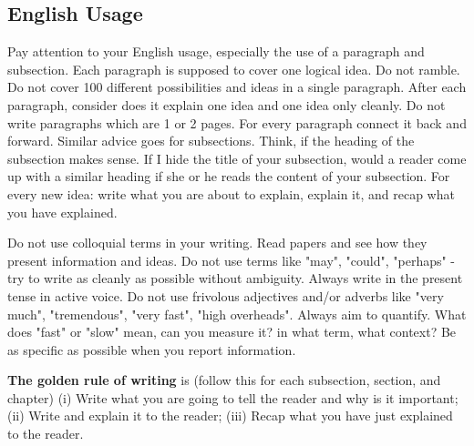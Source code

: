 \documentclass[11pt]{article}
\begin{document}
\subsection*{English Usage}
Pay attention to your English usage, especially the use of a paragraph and subsection. Each paragraph is supposed to cover one logical idea. Do not ramble. Do not cover 100 different possibilities and ideas in a single paragraph. After each paragraph, consider does it explain one idea and one idea only cleanly. Do not write paragraphs which are 1 or 2 pages. For every paragraph connect it back and forward. Similar advice goes for subsections. Think, if the heading of the subsection makes sense. If I hide the title of your subsection, would a reader come up with a similar heading if she or he reads the content of your subsection. For every new idea: write what you are about to explain, explain it, and recap what you have explained. 


Do not use colloquial terms in your writing. Read papers and see how they present information and ideas. Do not use terms like "may", "could", "perhaps" - try to write as cleanly as possible without ambiguity. Always write in the present tense in active voice. Do not use frivolous adjectives and/or adverbs like "very much", "tremendous", "very fast", "high overheads". Always aim to quantify. What does "fast" or  "slow" mean, can you measure it? in what term, what context? Be as specific as possible when you report information. 

\textbf{The golden rule of writing} is (follow this for each subsection, section, and chapter) (i) Write what you are going to tell the reader and why is it important; (ii) Write and explain it to the reader; (iii) Recap what you have just explained to the reader.  
\end{document}
